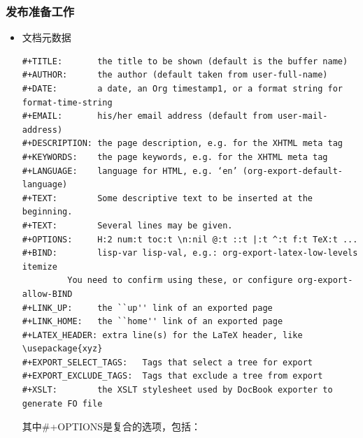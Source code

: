 \documentclass[11pt]{article}
\begin{document}
\subsubsection{发布准备工作}
\label{sec-6-2-3}
\begin{itemize}

\item 文档元数据\\
\label{sec-6-2-3-1}%
\begin{verbatim}
#+TITLE:       the title to be shown (default is the buffer name)
#+AUTHOR:      the author (default taken from user-full-name)
#+DATE:        a date, an Org timestamp1, or a format string for format-time-string
#+EMAIL:       his/her email address (default from user-mail-address)
#+DESCRIPTION: the page description, e.g. for the XHTML meta tag
#+KEYWORDS:    the page keywords, e.g. for the XHTML meta tag
#+LANGUAGE:    language for HTML, e.g. ‘en’ (org-export-default-language)
#+TEXT:        Some descriptive text to be inserted at the beginning.
#+TEXT:        Several lines may be given.
#+OPTIONS:     H:2 num:t toc:t \n:nil @:t ::t |:t ^:t f:t TeX:t ...
#+BIND:        lisp-var lisp-val, e.g.: org-export-latex-low-levels itemize
         You need to confirm using these, or configure org-export-allow-BIND
#+LINK_UP:     the ``up'' link of an exported page
#+LINK_HOME:   the ``home'' link of an exported page
#+LATEX_HEADER: extra line(s) for the LaTeX header, like \usepackage{xyz}
#+EXPORT_SELECT_TAGS:   Tags that select a tree for export
#+EXPORT_EXCLUDE_TAGS:  Tags that exclude a tree from export
#+XSLT:        the XSLT stylesheet used by DocBook exporter to generate FO file
\end{verbatim}
     其中\#+OPTIONS是复合的选项，包括：


\end{itemize}
\end{document}
